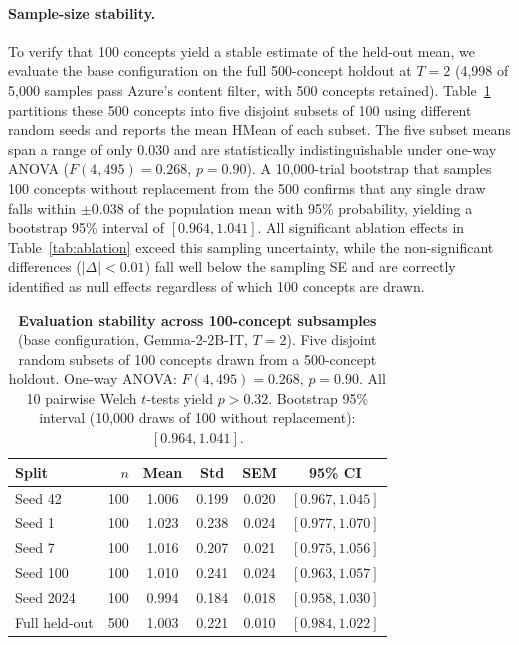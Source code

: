 \documentclass{article}
\begin{document}
\paragraph{Sample-size stability.}
To verify that 100 concepts yield a stable estimate of the held-out mean, we evaluate the base configuration on the full 500-concept holdout at $T\!=\!2$ (4{,}998 of 5{,}000 samples pass Azure's content filter, with 500 concepts retained). Table~\ref{tab:stability} partitions these 500 concepts into five disjoint subsets of 100 using different random seeds and reports the mean HMean of each subset. The five subset means span a range of only $0.030$ and are statistically indistinguishable under one-way ANOVA ($F(4, 495) = 0.268$, $p = 0.90$). A 10{,}000-trial bootstrap that samples 100 concepts without replacement from the 500 confirms that any single draw falls within $\pm 0.038$ of the population mean with 95\% probability, yielding a bootstrap 95\% interval of $[0.964, 1.041]$. All significant ablation effects in Table~\ref{tab:ablation} exceed this sampling uncertainty, while the non-significant differences ($|\Delta| < 0.01$) fall well below the sampling SE and are correctly identified as null effects regardless of which 100 concepts are drawn.

\begin{table}[htbp]
\centering\small
\begin{tabular}{lrcccc}
\toprule
\textbf{Split} & $n$ & \textbf{Mean} & \textbf{Std} & \textbf{SEM} & \textbf{95\% CI} \\
\midrule
Seed 42   & 100 & 1.006 & 0.199 & 0.020 & $[0.967, 1.045]$ \\
Seed 1    & 100 & 1.023 & 0.238 & 0.024 & $[0.977, 1.070]$ \\
Seed 7    & 100 & 1.016 & 0.207 & 0.021 & $[0.975, 1.056]$ \\
Seed 100  & 100 & 1.010 & 0.241 & 0.024 & $[0.963, 1.057]$ \\
Seed 2024 & 100 & 0.994 & 0.184 & 0.018 & $[0.958, 1.030]$ \\
\midrule
Full held-out & 500 & 1.003 & 0.221 & 0.010 & $[0.984, 1.022]$ \\
\bottomrule
\end{tabular}
\caption{\textbf{Evaluation stability across 100-concept subsamples} (base configuration, Gemma-2-2B-IT, $T\!=\!2$). Five disjoint random subsets of 100 concepts drawn from a 500-concept holdout. One-way ANOVA: $F(4, 495) = 0.268$, $p = 0.90$. All 10 pairwise Welch $t$-tests yield $p > 0.32$. Bootstrap 95\% interval (10{,}000 draws of 100 without replacement): $[0.964, 1.041]$.}
\label{tab:stability}
\end{table}
\end{document}
